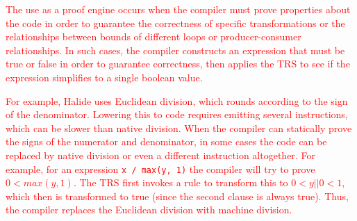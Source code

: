 \documentclass[acmsmall,review]{acmart}\settopmatter{printfolios=true,printccs=false,printacmref=false}
\newcommand{\modified}[1]{\textcolor{red}{{#1}}}
\newcommand{\hmax}[0]{\texttt{max}}
\newcommand{\hmin}[0]{\texttt{min}}
\begin{document}

\modified{The use as a proof engine occurs when the compiler must prove properties about the code in order to guarantee the
  correctness of specific transformations or the relationships between bounds of
  different loops or producer-consumer relationships.  In such cases, the compiler constructs
  an expression that must be true or false in order to guarantee correctness, then applies
  the TRS to see if the expression simplifies to a single boolean value.}

\modified{For example, Halide uses Euclidean division, which rounds according to the sign of the
  denominator.  Lowering this to code requires emitting several instructions, which can be
  slower than native division.  When the compiler can statically prove the signs of the numerator
  and denominator, in some cases the code can be replaced by native division or even a different
  instruction altogether.  For example, for an expression \texttt{x / max(y, 1)} the compiler
  will try to prove $0 < max(y, 1)$.  The TRS first invokes a rule to transform this to
  $0 < y || 0 < 1$, which then is transformed to true (since the second clause is always true).
  Thus, the compiler replaces the Euclidean division with machine division.}
\end{document}
